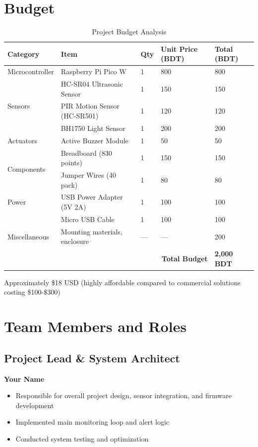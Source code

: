 \documentclass[12pt,a4paper]{article}
\begin{document}
\section{Budget}

\begin{table}[H]
\centering
\renewcommand{\arraystretch}{1.3}
\begin{tabularx}{\textwidth}{|X|X|X|X|X|}
\hline
\textbf{Category} & \textbf{Item} & \textbf{Qty} & \textbf{Unit Price (BDT)} & \textbf{Total (BDT)} \\
\hline
\multirow{1}{*}{Microcontroller} & Raspberry Pi Pico W & 1 & 800 & 800 \\
\hline
\multirow{3}{*}{Sensors} & HC-SR04 Ultrasonic Sensor & 1 & 150 & 150 \\
 & PIR Motion Sensor (HC-SR501) & 1 & 120 & 120 \\
 & BH1750 Light Sensor & 1 & 200 & 200 \\
\hline
Actuators & Active Buzzer Module & 1 & 50 & 50 \\
\hline
\multirow{2}{*}{Components} & Breadboard (830 points) & 1 & 150 & 150 \\
 & Jumper Wires (40 pack) & 1 & 80 & 80 \\
\hline
\multirow{1}{*}{Power} & USB Power Adapter (5V 2A) & 1 & 100 & 100 \\
 & Micro USB Cable & 1 & 100 & 100 \\
\hline
Miscellaneous & Mounting materials, enclosure & — & — & 200 \\
\hline
\multicolumn{4}{|r|}{\textbf{Total Budget}} & \textbf{2,000 BDT} \\
\hline
\end{tabularx}
\caption{Project Budget Analysis}
\label{tab:budget}
\end{table}

\noindent Approximately \$18 USD (highly affordable compared to commercial solutions costing \$100-\$300)

\section{Team Members and Roles}

\subsection{Project Lead \& System Architect}
\textbf{Your Name}
\begin{itemize}
\item Responsible for overall project design, sensor integration, and firmware development
\item Implemented main monitoring loop and alert logic
\item Conducted system testing and optimization
\end{itemize}
\end{document}
